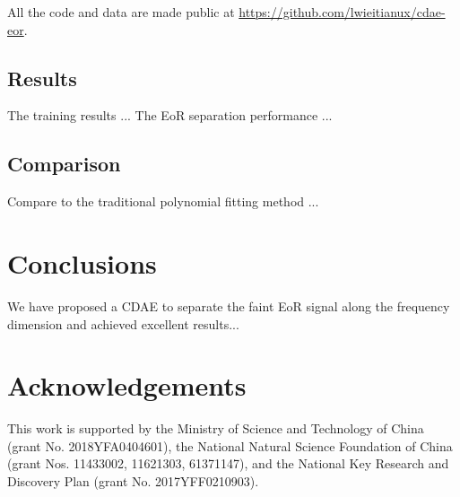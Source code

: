 \documentclass[letters,a4paper,fleqn,usenatbib]{mnras}
\begin{document}
All the code and data are made public at
\url{https://github.com/lwieitianux/cdae-eor}.


\subsection{Results}
\label{sec:results}

The training results ...
The EoR separation performance ...


\subsection{Comparison}
\label{sec:comparison}

Compare to the traditional polynomial fitting method ...


\section{Conclusions}
\label{sec:conclusions}

We have proposed a CDAE to separate the faint EoR signal along the
frequency dimension and achieved excellent results...


\section*{Acknowledgements}

This work is supported by
the Ministry of Science and Technology of China
(grant No. 2018YFA0404601),
the National Natural Science Foundation of China
(grant Nos. 11433002, 11621303, 61371147),
and the National Key Research and Discovery Plan
(grant No. 2017YFF0210903).










\bsp	%
\label{lastpage}
\end{document}
